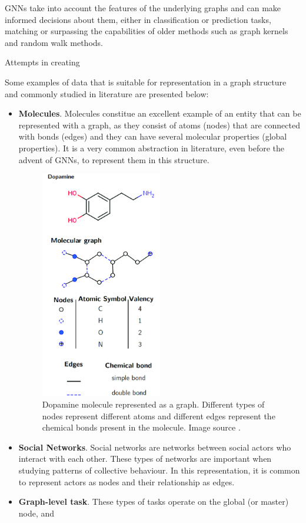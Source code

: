 GNNs take into account the features of the underlying graphs
and can make informed decisions about them, either in classification
or prediction tasks, matching or surpassing the capabilities of older methods
such as graph kernels and random walk methods.

Attempts in creating 

Some examples of data that is suitable for representation in
a graph structure and commonly studied in literature are presented
below:

\begin{itemize}
\item
  \textbf{Molecules}. Molecules constitue an excellent example
  of an entity that can be represented with a graph, as they consist of
  atoms (nodes) that are connected with bonds (edges) and they can
  have several molecular properties (global properties). It is a
  very common abstraction in literature, even before the advent of
  GNNs, to represent them in this structure\cite{article:duvenaud}.
  \begin{figure}[H]
    \centering
    \includegraphics[width=0.5\textwidth]{Figures/chap_gnn/dopamine.png}
    \caption{Dopamine molecule represented as a graph. Different types of nodes represent different atoms and different edges represent the chemical bonds present in the molecule. Image source \citet{article:stefi}.}
    \label{fig:dopamine}
  \end{figure}
\item
  \textbf{Social Networks}. Social networks are networks between
    social actors who interact with each other. These types of networks
    are important when studying patterns of collective behaviour. In this
    representation, it is common to represent actors as nodes and their
    relationship as edges.
  
\end{itemize}


\begin{itemize}
\item
  \textbf{Graph-level task}. These types of tasks operate
  on the global (or master) node, and 
\end{itemize}